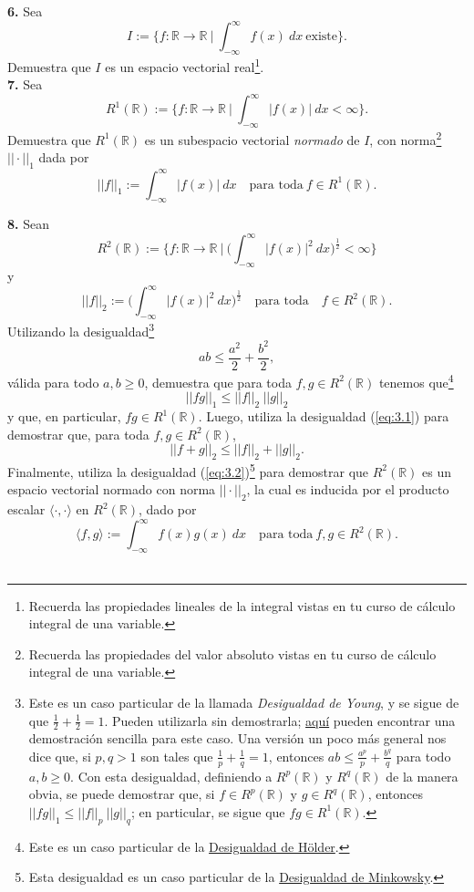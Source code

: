 \documentclass[a4paper]{article}
\begin{document}
\textbf{6.} Sea
\[
I:=\bigg\{f:\mathbb{R}\to\mathbb{R} \ \bigg| \ \int_{-\infty}^\infty f(x) \ dx \ \text{existe}\bigg\}. 
\]
Demuestra que $I$ es un espacio vectorial real\footnote{Recuerda las propiedades lineales de la integral vistas en tu curso de cálculo integral de una variable.}. \\

\textbf{7.} Sea
\[
    R^1(\mathbb{R}):=\bigg\{f:\mathbb{R}\to\mathbb{R} \ \bigg| \ \int_{-\infty}^\infty |f(x)| \ dx < \infty \bigg\}.
\] Demuestra que $R^1(\mathbb{R})$ es un subespacio vectorial \emph{normado} de $I$, con norma\footnote{Recuerda las propiedades del valor absoluto vistas en tu curso de cálculo integral de una variable.} $||\cdot||_1$ dada por 
\[
    ||f||_1 := \int_{-\infty}^\infty |f(x)| \ dx \quad \text{para toda} \ f\in R^1(\mathbb{R}).
\] 

\newpage
\textbf{8.} Sean
\[
    R^2(\mathbb{R}):= \bigg\{f:\mathbb{R}\to\mathbb{R} \ \bigg| \ \bigg( \int_{-\infty}^\infty |f(x)|^2 \ dx \bigg)^{\frac{1}{2}} < \infty \bigg\}
\]
y
\[
    ||f||_2:=\bigg(\int_{-\infty}^\infty |f(x)|^2 \ dx\bigg)^\frac{1}{2} \quad \text{para toda} \quad f\in R^2(\mathbb{R}).
\]
Utilizando la desigualdad\footnote{Este es un caso particular de la llamada \emph{Desigualdad de Young}, y se sigue de que $\frac{1}{2}+\frac{1}{2}=1$. Pueden utilizarla sin demostrarla; \href{https://en.wikipedia.org/wiki/Young\%27s\_inequality\_for\_products\#Elementary\_case}{aquí} pueden encontrar una demostración sencilla para este caso. Una versión un poco más general nos dice que, si $p,q>1$ son tales que $\frac{1}{p} + \frac{1}{q} = 1$, entonces $ab\le \frac{a^p}{p} + \frac{b^q}{q}$ para todo $a,b\ge 0$. Con esta desigualdad, definiendo a $R^p(\mathbb{R})$ y $R^q(\mathbb{R})$ de la manera obvia, se puede demostrar que, si $f\in R^p(\mathbb{R})$ y $g\in R^q(\mathbb{R})$, entonces $||fg||_1\le ||f||_p \ ||g||_q$; en particular, se sigue que $fg\in R^1(\mathbb{R})$.}
\[
ab\le \frac{a^2}{2} + \frac{b^2}{2},
\]
válida para todo $a,b\ge0$, demuestra que para toda $f,g\in R^2(\mathbb{R})$ tenemos que\footnote{Este es un caso particular de la \href{https://en.wikipedia.org/wiki/Hölder's_inequality}{Desigualdad de Hölder}.}
\begin{equation}\label{eq:3.1}
||fg||_1 \le ||f||_2 \ ||g||_2   
\end{equation}
y que, en particular, $fg\in R^1(\mathbb{R})$. Luego, utiliza la desigualdad (\ref{eq:3.1}) para demostrar que, para toda $f,g\in R^2(\mathbb{R})$,
\begin{equation}\label{eq:3.2}
    ||f+g||_2\le ||f||_2 + ||g||_2.
\end{equation}
Finalmente, utiliza la desigualdad (\ref{eq:3.2})\footnote{Esta desigualdad es un caso particular de la \href{https://en.wikipedia.org/wiki/Minkowski_inequality}{Desigualdad de Minkowsky}.} para demostrar que $R^2(\mathbb{R})$ es un espacio vectorial normado con norma $||\cdot||_2$, la cual es inducida por el producto escalar $\langle \cdot , \cdot \rangle$ en $R^2(\mathbb{R})$, dado por
\[
    \langle f , g \rangle := \int_{-\infty}^\infty f(x)g(x) \ dx \quad \text{para toda} \ f,g\in R^2(\mathbb{R}).
\] \\
\end{document}
